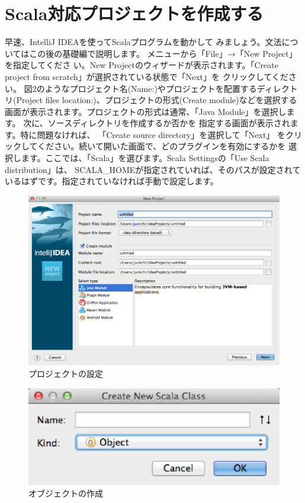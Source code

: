 \documentclass[10pt]{jarticle}
\begin{document}
\section{Scala対応プロジェクトを作成する}
早速、IntelliJ IDEAを使ってScalaプログラムを動かして みましょう。文法についてはこの後の基礎編で説明します。 メニューから「File」→「New Project」を指定してくださ い。New Projectのウィザードが表示されます。「Create project from scratch」が選択されている状態で「Next」を クリックしてください。 図2のようなプロジェクト名(Name:)やプロジェクトを配置するディレクトリ(Project files location:)、プロジェクトの形式(Create module)などを選択する画面が表示されます。プロジェクトの形式は通常、「Java Module」を選択します。 次に、ソースディレクトリを作成するか否かを 指定する画面が表示されます。特に問題なければ、 「Create source directory」を選択して「Next」 をクリックしてください。続いて開いた画面で、どのプラグインを有効にするかを 選択します。ここでは、「Scala」を選びます。Scala Settingsの「Use Scala distribution」は、 SCALA\_HOMEが指定されていれば、そのパスが設定されているはずです。指定されていなければ手動で設定します。

\begin{figure}[hb]
  \centering
  \caption{プロジェクトの設定}
  \includegraphics[scale=0.5]{img/new_project.eps}
\end{figure}

\begin{figure}[hb]
  \centering
  \caption{オブジェクトの作成}
  \includegraphics[scale=0.5]{img/create_new_scala_class.eps}
\end{figure}
\end{document}
